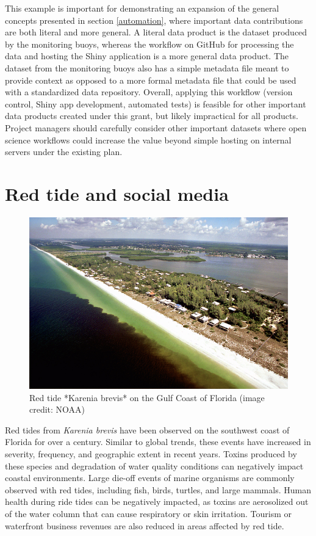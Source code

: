 \documentclass[
]{book}
\begin{document}
This example is important for demonstrating an expansion of the general concepts presented in section \ref{automation}, where important data contributions are both literal and more general. A literal data product is the dataset produced by the monitoring buoys, whereas the workflow on GitHub for processing the data and hosting the Shiny application is a more general data product. The dataset from the monitoring buoys also has a simple metadata file meant to provide context as opposed to a more formal metadata file that could be used with a standardized data repository. Overall, applying this workflow (version control, Shiny app development, automated tests) is feasible for other important data products created under this grant, but likely impractical for all products. Project managers should carefully consider other important datasets where open science workflows could increase the value beyond simple hosting on internal servers under the existing plan.

\hypertarget{twitter}{%
\section{Red tide and social media}\label{twitter}}

\begin{figure}

{\centering \includegraphics[width=0.8\linewidth]{img/red tide} 

}

\caption{Red tide *Karenia brevis* on the Gulf Coast of Florida (image credit: NOAA)}\label{fig:unnamed-chunk-14}
\end{figure}

Red tides from \emph{Karenia brevis} have been observed on the southwest coast of Florida for over a century. Similar to global trends, these events have increased in severity, frequency, and geographic extent in recent years. Toxins produced by these species and degradation of water quality conditions can negatively impact coastal environments. Large die-off events of marine organisms are commonly observed with red tides, including fish, birds, turtles, and large mammals. Human health during ride tides can be negatively impacted, as toxins are aerosolized out of the water column that can cause respiratory or skin irritation. Tourism or waterfront business revenues are also reduced in areas affected by red tide.
\end{document}
